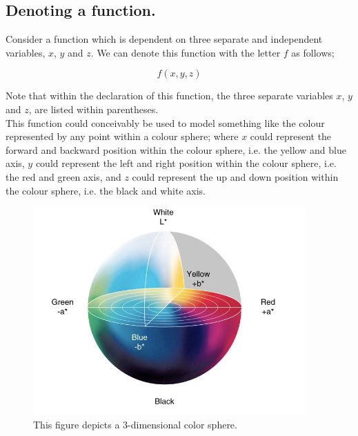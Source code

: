 \documentclass{article}
\begin{document}
\subsection{Denoting a function.}

Consider a function which is dependent on three separate and independent variables, \begin{math} x\end{math}, $y$ and 
\begin{math} z\end{math}. We can denote this function with the letter \begin{math} f \end{math} as follows;

\begin{equation*}
  f(x, y, z)
\end{equation*}

Note that within the declaration of this function, the three separate variables \begin{math} x\end{math}, 
\begin{math}y\end{math} and \begin{math} z\end{math}, are listed within parentheses.\\

This function could conceivably be used to model something like the colour represented by any point within a 
colour sphere; where \begin{math} x \end{math} could represent the forward and backward position within the
colour sphere, i.e. the yellow and blue axis, \begin{math} y \end{math} could represent the left and right position
within the colour sphere, i.e. the red and green axis, and \begin{math} z \end{math} could represent the up and down
position within the colour sphere, i.e. the black and white axis.

\newpage

\begin{figure}
  \includegraphics[scale=0.75]{images/Color_sphere.png}
  \caption{This figure depicts a 3-dimensional color sphere.}
  \label{fig:Color_sphere}
\end{figure}
\end{document}
